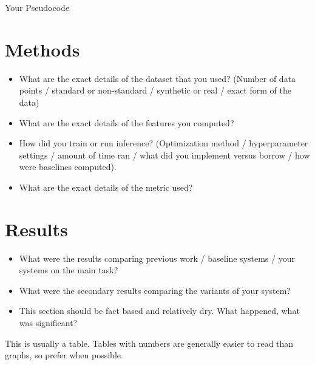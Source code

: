 \documentclass{article}
\begin{document}
\lipsum[4-8]

\begin{algorithm}
  \begin{algorithmic}
    \STATE{\lipsum[1]}
  \end{algorithmic}
  \caption{Your Pseudocode}
\end{algorithm}




\section{Methods}

\begin{itemize}
\item What are the exact details of the dataset that you used? (Number of data points / standard or non-standard / synthetic or real / exact form of the data)

\item What are the exact details of the features you computed?


\item How did you train or run inference? (Optimization method / hyperparameter settings / amount of time ran / what did you implement versus borrow / how were baselines computed).

\item What are the exact details of the metric used?
\end{itemize}

\lipsum[4-8]

\section{Results}

\begin{itemize}
\item What were the results comparing previous work / baseline systems / your systems on the main task?
\item What were the secondary results comparing the variants of your system?
\item This section should be fact based and relatively dry. What happened, what was significant?
\end{itemize}

\begin{table*}
  \centering
  \missingfigure{}
  \caption{This is usually a table. Tables with numbers are generally easier to read than graphs, so prefer when possible.}
  \label{fig:mainres}
\end{table*}
\end{document}
